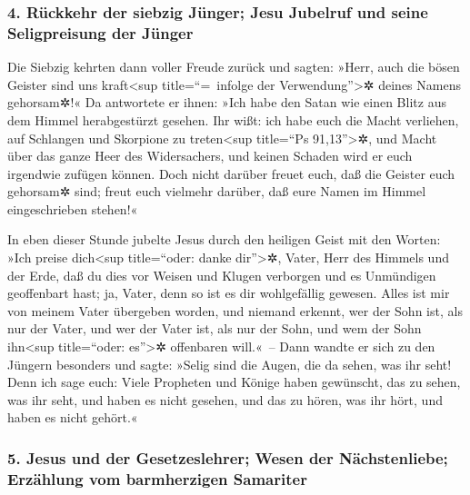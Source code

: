\hypertarget{ruxfcckkehr-der-siebzig-juxfcnger-jesu-jubelruf-und-seine-seligpreisung-der-juxfcnger}{%
\subsubsection{4. Rückkehr der siebzig Jünger; Jesu Jubelruf und seine
Seligpreisung der
Jünger}\label{ruxfcckkehr-der-siebzig-juxfcnger-jesu-jubelruf-und-seine-seligpreisung-der-juxfcnger}}

 Die Siebzig kehrten dann voller Freude zurück und
sagten: »Herr, auch die bösen Geister sind uns kraft\textless sup
title=``=~infolge der Verwendung''\textgreater✲ deines Namens
gehorsam✲!«  Da antwortete er ihnen: »Ich habe den Satan
wie einen Blitz aus dem Himmel herabgestürzt gesehen. 
Ihr wißt: ich habe euch die Macht verliehen, auf Schlangen und Skorpione
zu treten\textless sup title=``Ps 91,13''\textgreater✲, und Macht über
das ganze Heer des Widersachers, und keinen Schaden wird er euch
irgendwie zufügen können.  Doch nicht darüber freuet
euch, daß die Geister euch gehorsam✲ sind; freut euch vielmehr darüber,
daß eure Namen im Himmel eingeschrieben stehen!«

 In eben dieser Stunde jubelte Jesus durch den heiligen
Geist mit den Worten: »Ich preise dich\textless sup title=``oder: danke
dir''\textgreater✲, Vater, Herr des Himmels und der Erde, daß du dies
vor Weisen und Klugen verborgen und es Unmündigen geoffenbart hast; ja,
Vater, denn so ist es dir wohlgefällig gewesen.  Alles
ist mir von meinem Vater übergeben worden, und niemand erkennt, wer der
Sohn ist, als nur der Vater, und wer der Vater ist, als nur der Sohn,
und wem der Sohn ihn\textless sup title=``oder: es''\textgreater✲
offenbaren will.«~--  Dann wandte er sich zu den Jüngern
besonders und sagte: »Selig sind die Augen, die da sehen, was ihr seht!
 Denn ich sage euch: Viele Propheten und Könige haben
gewünscht, das zu sehen, was ihr seht, und haben es nicht gesehen, und
das zu hören, was ihr hört, und haben es nicht gehört.«

\hypertarget{jesus-und-der-gesetzeslehrer-wesen-der-nuxe4chstenliebe-erzuxe4hlung-vom-barmherzigen-samariter}{%
\subsubsection{5. Jesus und der Gesetzeslehrer; Wesen der Nächstenliebe;
Erzählung vom barmherzigen
Samariter}\label{jesus-und-der-gesetzeslehrer-wesen-der-nuxe4chstenliebe-erzuxe4hlung-vom-barmherzigen-samariter}}

